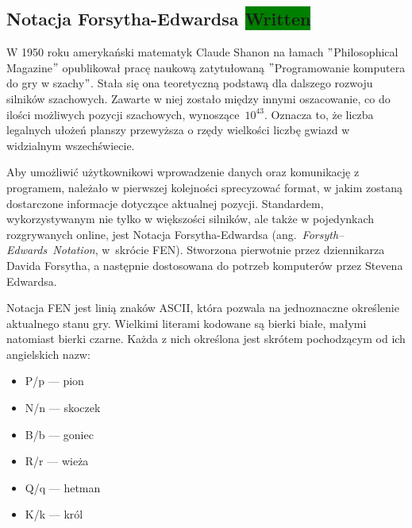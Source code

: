 \subsection{Notacja Forsytha-Edwardsa \colorbox{green}{Written}}
\label{subsec:notacja-fen}


W 1950 roku amerykański matematyk Claude Shanon na łamach \("\)Philosophical Magazine\("\) opublikował pracę naukową zatytułowaną \("\)Programowanie komputera do gry w szachy\("\). \cite*{Shannon1950XXIIPA}
Stała się ona teoretyczną podstawą dla dalszego rozwoju silników szachowych.
Zawarte w niej zostało między innymi oszacowanie, co do ilości możliwych pozycji szachowych, wynoszące~$10^{43}$.
Oznacza to, że liczba legalnych ułożeń planszy przewyższa o rzędy wielkości liczbę gwiazd w widzialnym wszechświecie.


Aby umożliwić użytkownikowi wprowadzenie danych oraz komunikację z programem, należało w pierwszej kolejności sprecyzować format, w jakim zostaną dostarczone informacje dotyczące aktualnej pozycji.
Standardem, wykorzystywanym nie tylko w większości silników, ale także w pojedynkach rozgrywanych online, jest Notacja Forsytha-Edwardsa (ang.~\emph{Forsyth–Edwards~Notation}, w~skrócie FEN).
Stworzona pierwotnie przez dziennikarza Davida Forsytha, a następnie dostosowana do potrzeb komputerów przez Stevena Edwardsa.

Notacja FEN jest linią znaków ASCII, która pozwala na jednoznaczne określenie aktualnego stanu gry.
Wielkimi literami kodowane są bierki białe, małymi natomiast bierki czarne.
Każda z nich określona jest skrótem pochodzącym od ich angielskich nazw:
\begin{multicols}{3}
    \begin{itemize}
        \item P/p — pion
        \item N/n — skoczek
        \item B/b — goniec
        \item R/r — wieża
        \item Q/q — hetman
        \item K/k — król
    \end{itemize}
\end{multicols}

